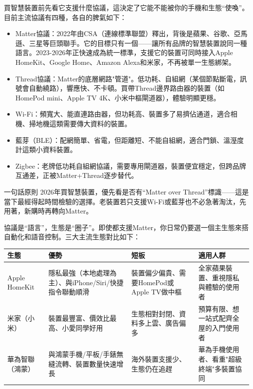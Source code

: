 


買智慧裝置前先看它支援什麼協議，這決定了它能不能被你的手機和生態“使喚”。目前主流協議有四種，各自的脾氣如下：

\begin{itemize}
  \item Matter協議：2022年由CSA（連線標準聯盟）釋出，背後是蘋果、谷歌、亞馬遜、三星等巨頭聯手。它的目標只有一個——讓所有品牌的智慧裝置說同一種語言。2023-2026年正快速成為統一標準，支援它的裝置可同時接入Apple HomeKit、Google Home、Amazon Alexa和米家，不再被單一生態綁架。
  \item Thread協議：Matter的底層網路"管道"。低功耗、自組網（某個節點斷電，訊號會自動繞路），響應快、不卡頓。買帶Thread邊界路由器的裝置（如HomePod mini、Apple TV 4K、小米中樞閘道器），體驗明顯更穩。
  \item Wi-Fi：頻寬大、能直連路由器，但功耗高、裝置多了易擠佔通道，適合相機、掃地機這類需要傳大資料的裝置。
  \item 藍芽（BLE）：配網簡單、省電，但距離短、不能自組網，適合門鎖、溫溼度計這類小資料裝置。
  \item Zigbee：老牌低功耗自組網協議，需要專用閘道器，裝置便宜穩定，但跨品牌互通差，正被Matter+Thread逐步替代。
\end{itemize}

\begin{tcbinfo}{一句話原則}
2026年買智慧裝置，優先看是否有“Matter over Thread”標識——這是當下最經得起時間檢驗的選擇。老裝置若只支援Wi-Fi或藍芽也不必急著淘汰，先用著，新購時再轉向Matter。

\end{tcbinfo}


協議是“語言”，生態是“圈子”。即使都支援Matter，你日常仍要選一個主生態來搭自動化和語音控制。三大主流生態對比如下：

\begin{center}
\begin{tabularx}{\linewidth}{|X|X|X|X|}
\hline
\textbf{生態} & \textbf{優勢} & \textbf{短板} & \textbf{適用人群} \tabularnewline
\hline
Apple HomeKit & 隱私最強（本地處理為主）、與iPhone/Siri/快捷指令聯動順滑 & 裝置偏少偏貴、需要HomePod或Apple TV做中樞 & 全家蘋果裝置、重視隱私與體驗的使用者 \tabularnewline
米家（小米） & 裝置最豐富、價效比最高、小愛同學好用 & 生態相對封閉、資料多上雲、廣告偏多 & 預算有限、想一站式配齊全屋的入門使用者 \tabularnewline
華為智聯（鴻蒙） & 與鴻蒙手機/平板/手錶無縫流轉、裝置數量快速增長 & 海外裝置支援少、生態仍在追趕 & 華為手機使用者、看重"超級終端"多裝置協同 \tabularnewline
\hline
\end{tabularx}
\end{center}

